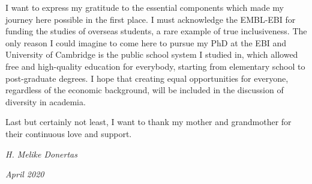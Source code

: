 \documentclass[12pt,twoside]{unicam}
\begin{document}
\begin{acknowledgements}
    \vspace{0.3cm}

    I want to express my gratitude to the essential components which made my journey here possible in the first place. I must acknowledge the EMBL-EBI for funding the studies of overseas students, a rare example of true inclusiveness. The only reason I could imagine to come here to pursue my PhD at the EBI and University of Cambridge is the public school system I studied in, which allowed free and high-quality education for everybody, starting from elementary school to post-graduate degrees. I hope that creating equal opportunities for everyone, regardless of the economic background, will be included in the discussion of diversity in academia.

    \vspace{0.3cm}

    Last but certainly not least, I want to thank my mother and grandmother for their continuous love and support.

    \vspace{0.6cm}
    \begin{flushright}
    \emph{H. Melike Donertas}

    \emph{April 2020}
    \end{flushright}
  \end{acknowledgements}
\end{document}
